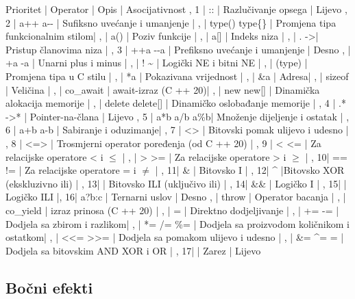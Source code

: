 \documentclass[11pt]{book}
\begin{document}
{
Prioritet | Operator | Opis | Asocijativnost ,
1 | :: | Razlučivanje opsega | Lijevo ,
2 | a++ a-{}- | Sufiksno uvećanje i umanjenje | ,
| type() type\{\} | Promjena tipa funkcionalnim stilom| ,
| a() | Poziv funkcije | , | a{[}{]} | Indeks niza | ,
| . ->| Pristup članovima niza | ,
3 | ++a -{}-a | Prefiksno uvećanje i umanjenje | Desno ,
| +a -a | Unarni plus i minus | ,
| ! \textasciitilde{} | Logički NE i bitni NE | ,
| (type) | Promjena tipa u C stilu | ,
| {*}a | Pokazivana vrijednost | ,
| \&a | Adresa| ,
| sizeof | Veličina | ,
| co\_await | await-izraz (C ++ 20)| ,
| new new{[}{]} | Dinamička alokacija memorije | ,
| delete delete{[}{]} | Dinamičko oslobađanje memorije | ,
4 | .{*} ->{*} | Pointer-na-člana | Lijevo ,
5 | a{*}b a/b a\%b| Množenje \com dijeljenje i ostatak | ,
6 | a+b a-b | Sabiranje i oduzimanje| ,
7 | <\textcompwordmark < >\textcompwordmark > | Bitovski pomak ulijevo i udesno | ,
8 | <=> | Trosmjerni operator poređenja (od C ++ 20) | ,
9 | < <= | Za relacijske operatore < i \ensuremath{\le} | ,
| > >= | Za relacijske operatore > i \ensuremath{\ge} | ,
10| == != | Za relacijske operatore = i \ensuremath{\neq} | ,
11| \& | Bitovsko I | ,
12| \textasciicircum{} |Bitovsko XOR (ekskluzivno ili) | ,
13| \vbr | Bitovsko ILI (uključivo ili) | ,
14| \&\& | Logičko I | ,
15| \vbr\vbr | Logičko ILI |,
16| a?b:c | Ternarni uslov | Desno ,
| throw | Operator bacanja | ,
| co\_yield | izraz prinosa (C ++ 20) | ,
| = | Direktno dodjeljivanje | ,
| += -= | Dodjela sa zbirom i razlikom| ,
| {*}= /= \%= | Dodjela sa proizvodom \com količnikom i ostatkom| ,
| <\textcompwordmark <= >\textcompwordmark >= | Dodjela sa pomakom ulijevo i udesno | ,
| \&= \textasciicircum = \vbr= | Dodjela sa bitovskim AND \com XOR i OR | ,
17| \com | Zarez | Lijevo
}

\subsection{Bočni efekti}
\end{document}
